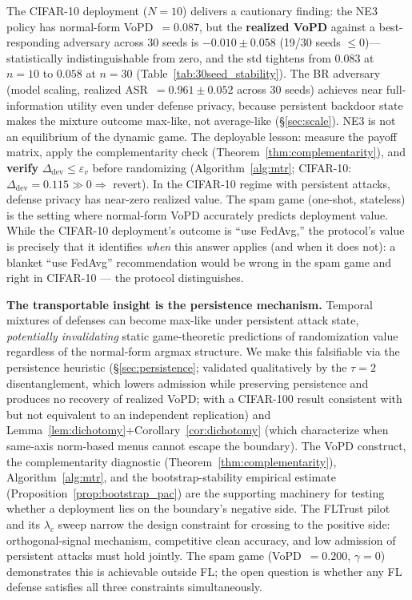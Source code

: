 \documentclass{article}
\begin{document}
The CIFAR-10 deployment ($N=10$) delivers a cautionary finding: the NE3 policy has normal-form VoPD~$= 0.087$, but the \textbf{realized VoPD} against a best-responding adversary across 30 seeds is $\mathbf{-0.010 \pm 0.058}$ (19/30 seeds $\leq 0$)---statistically indistinguishable from zero, and the std tightens from $0.083$ at $n{=}10$ to $0.058$ at $n{=}30$ (Table~\ref{tab:30seed_stability}). The BR adversary (model scaling, realized ASR~$= 0.961 \pm 0.052$ across 30 seeds) achieves near full-information utility even under defense privacy, because persistent backdoor state makes the mixture outcome max-like, not average-like (§\ref{sec:scale}). NE3 is not an equilibrium of the dynamic game. The deployable lesson: measure the payoff matrix, apply the complementarity check (Theorem~\ref{thm:complementarity}), and \textbf{verify} $\Delta_{\mathrm{dev}} \leq \varepsilon_v$ before randomizing (Algorithm~\ref{alg:mtr}; CIFAR-10: $\Delta_{\mathrm{dev}} = 0.115 \gg 0 \Rightarrow$ revert). In the CIFAR-10 regime with persistent attacks, defense privacy has near-zero realized value. The spam game (one-shot, stateless) is the setting where normal-form VoPD accurately predicts deployment value. While the CIFAR-10 deployment's outcome is ``use FedAvg,'' the protocol's value is precisely that it identifies \emph{when} this answer applies (and when it does not): a blanket ``use FedAvg'' recommendation would be wrong in the spam game and right in CIFAR-10 --- the protocol distinguishes.

\textbf{The transportable insight is the persistence mechanism.} Temporal mixtures of defenses can become max-like under persistent attack state, \emph{potentially invalidating} static game-theoretic predictions of randomization value regardless of the normal-form argmax structure. We make this falsifiable via the persistence heuristic (§\ref{sec:persistence}; validated qualitatively by the $\tau{=}2$ disentanglement, which lowers admission while preserving persistence and produces no recovery of realized VoPD; with a CIFAR-100 result consistent with but not equivalent to an independent replication) and Lemma~\ref{lem:dichotomy}+Corollary~\ref{cor:dichotomy} (which characterize when same-axis norm-based menus cannot escape the boundary). The VoPD construct, the complementarity diagnostic (Theorem~\ref{thm:complementarity}), Algorithm~\ref{alg:mtr}, and the bootstrap-stability empirical estimate (Proposition~\ref{prop:bootstrap_pac}) are the supporting machinery for testing whether a deployment lies on the boundary's negative side. The FLTrust pilot and its $\lambda_c$ sweep narrow the design constraint for crossing to the positive side: orthogonal-signal mechanism, competitive clean accuracy, and low admission of persistent attacks must hold jointly. The spam game (VoPD~$=0.200$, $\gamma=0$) demonstrates this is achievable outside FL; the open question is whether any FL defense satisfies all three constraints simultaneously.
\end{document}
